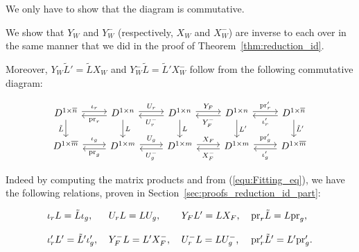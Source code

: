 \documentclass{ifacconf}
\newcommand\p{\text{pr}}
\begin{document}
\begin{pf}
  We only have to show that the diagram is commutative.

  We show that $Y_W$ and $Y_W^-$ (respectively, $X_W$ and $X_W^-$) are
  inverse to each over in the same manner that we did in the proof of
  Theorem~\ref{thm:reduction_id}.

  Moreover, $Y_W\tilde{L}'=\tilde{L}X_W$ and $Y_W^-\tilde{L}=\tilde{L}'
  X_W^-$ follow from the following commutative diagram:
  \vspace{-0.4cm}
  \begin{center}
    \begin{small}
    \[
      \begin{tikzcd}
        D^{1\times\overline{n}}\arrow[d, "\tilde{L}"']\arrow[r, "\iota_r", shift right=-0.5ex] &
        D^{1\times n}\arrow[d, "L"]\arrow[r, "U_r", shift right=-0.5ex]
        \arrow[l, "\p_r", shift left=0.5ex] &
        D^{1\times n}\arrow[d, "L"]\arrow[r, "Y_F", shift right=-0.5ex] 
        \arrow[l, "U_r^-", shift right=-0.5ex] &
        D^{1\times n}\arrow[d, "L'"]\arrow[r, "\p'_r", shift right=-0.5ex] 
        \arrow[l, "Y_F^-", shift right=-0.5ex] &
        D^{1\times\overline{n}}\arrow[d, "\tilde{L}'"]
        \arrow[l, "\iota_r'", shift right=-0.5ex] 
        \\
        D^{1\times\overline{m}}\arrow[r, "\iota_g", shift right=-0.5ex] &
        D^{1\times m}\arrow[r, "U_g", shift right=-0.5ex]
        \arrow[l, "\p_g", shift left=0.5ex] &
        D^{1\times m}\arrow[r, "X_F", shift right=-0.5ex]
        \arrow[l, "U_g^-", shift right=-0.5ex] &
        D^{1\times m}\arrow[r, "\p'_g", shift right=-0.5ex]
        \arrow[l, "X_F^-", shift right=-0.5ex] &
        D^{1\times\overline{m}}
        \arrow[l, "\iota_g'", shift right=-0.5ex] 
      \end{tikzcd}
      \]
      \end{small}
  \end{center}
  Indeed by computing the matrix products and
  from (\ref{equ:Fitting_eq}), we have the following relations, proven in
  Section~\ref{sec:proofs_reduction_id_part}:
  \begin{small}
    \begin{equation}
      \label{eq:formulas_reduction_id_part}
      \begin{tabular}{l l l l}
        $\iota_rL=\tilde{L}\iota_g,$ & $U_rL=LU_g,$ & $Y_FL'=LX_F$, &
        $\p_r\tilde{L}=L\p_g$,\\
        & & \\
        $\iota_r'L'=\tilde{L}'\iota'_g,$ & $Y_F^-L=L'X_F^-,$ & $U_r^-L=LU_g^-$,
        & $\p_r'\tilde{L}'=L'\p'_g$.
      \end{tabular}
    \end{equation}
  \end{small}
\end{pf}
\end{document}
